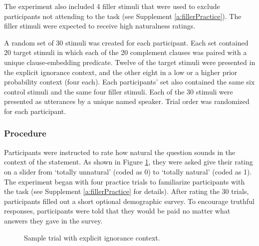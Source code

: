 \documentclass[11pt,fleqn]{article}
\newcommand{\6}{\mbox{$[\hspace*{-.6mm}[$}}
\newcommand{\9}{\mbox{$]\hspace*{-.6mm}]$}}
\begin{document}
The experiment also included 4 filler stimuli that were used to exclude participants not attending to the task (see Supplement \ref{a:fillerPractice}). The filler stimuli were expected to receive high naturalness ratings.

A random set of 30 stimuli was created for each participant. Each set contained 20 target stimuli in which each of the 20 complement clauses was paired with a unique clause-embedding predicate. Twelve of the target stimuli were presented in the explicit ignorance context, and the other eight in a low or a higher prior probability context (four each). Each participants' set also contained the same six control stimuli and the same four filler stimuli. Each of the 30 stimuli were presented as utterances by a unique named speaker. Trial order was randomized for each participant. 

\subsubsection{Procedure}

Participants were instructed to rate how natural the question sounds in the context of the statement. As shown in Figure \ref{f:trials}, they were asked give their rating on a slider from `totally unnatural' (coded as 0) to `totally natural' (coded as 1). The experiment began with four practice trials to familiarize participants with the task (see Supplement \ref{a:fillerPractice} for details). After rating the 30 trials, participants filled out a short optional demographic survey. To encourage truthful responses, participants were told that they would be paid no matter what answers they gave in the survey.


\begin{figure}[h]
\centering
\caption{Sample trial with explicit ignorance context.}\label{f:trials}
\end{figure}
\end{document}
